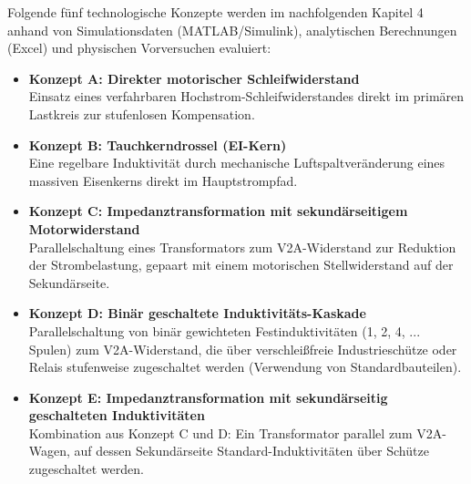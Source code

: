 Folgende fünf technologische Konzepte werden im nachfolgenden Kapitel 4 anhand von Simulationsdaten (MATLAB/Simulink), analytischen Berechnungen (Excel) und physischen Vorversuchen evaluiert:
\begin{itemize}
    \item \textbf{Konzept A: Direkter motorischer Schleifwiderstand} \\
    Einsatz eines verfahrbaren Hochstrom-Schleifwiderstandes direkt im primären Lastkreis zur stufenlosen Kompensation.
    \item \textbf{Konzept B: Tauchkerndrossel (EI-Kern)} \\
    Eine regelbare Induktivität durch mechanische Luftspaltveränderung eines massiven Eisenkerns direkt im Hauptstrompfad.
    \item \textbf{Konzept C: Impedanztransformation mit sekundärseitigem Motorwiderstand} \\
    Parallelschaltung eines Transformators zum V2A-Widerstand zur Reduktion der Strombelastung, gepaart mit einem motorischen Stellwiderstand auf der Sekundärseite.
    \item \textbf{Konzept D: Binär geschaltete Induktivitäts-Kaskade} \\
    Parallelschaltung von binär gewichteten Festinduktivitäten (1, 2, 4, ... Spulen) zum V2A-Widerstand, die über verschleißfreie Industrieschütze oder Relais stufenweise zugeschaltet werden (Verwendung von Standardbauteilen).
    \item \textbf{Konzept E: Impedanztransformation mit sekundärseitig geschalteten Induktivitäten} \\
    Kombination aus Konzept C und D: Ein Transformator parallel zum V2A-Wagen, auf dessen Sekundärseite Standard-Induktivitäten über Schütze zugeschaltet werden.
\end{itemize}